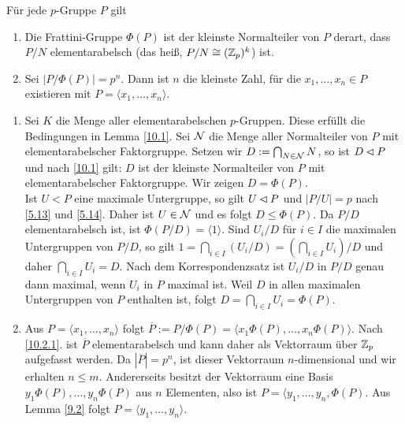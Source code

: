 \begin{satz}
\label{10.2}
F\"ur jede $p$-Gruppe $P$ gilt
\begin{enumerate}
 \item \label{10.2.1}Die Frattini-Gruppe $\Phi(P)$ ist der kleinste Normalteiler von $P$ derart, dass $P/N$ elementarabelsch (das hei\ss{}, $P/N\cong (\mathbb{Z}_p)^k$) ist.
 \item \label{10.2.2}Sei $|P/\Phi(P)|=p^n$. Dann ist $n$ die kleinste Zahl, f\"ur die $x_1,\ldots,x_n\in P$ existieren mit $P=\langle x_1,\ldots,x_n\rangle$.
\end{enumerate}


\end{satz}
\begin{beweis}\spspace
\begin{enumerate}
 \item Sei $K$ die Menge aller elementarabelschen $p$-Gruppen. Diese erf\"ullt die Bedingungen in Lemma \ref{10.1}. Sei $\mathcal{N}$ die Menge aller Normalteiler von $P$ mit elementarabelscher Faktorgruppe. Setzen wir $D:=\bigcap_{N\in \mathcal{N}} N$, so ist $D\lhd P$ und nach \ref{10.1} gilt: $D$ ist der kleinste Normalteiler von $P$ mit elementarabelscher Faktorgruppe. Wir zeigen $D=\Phi(P)$.\\
Ist $U<P$ eine maximale Untergruppe, so gilt $U\lhd P$ und $|P/U|=p$ nach \ref{5.13} und \ref{5.14}.
Daher ist $U\in \mathcal{N}$ und es folgt $D\leq \Phi(P)$.
Da $P/D$ elementarabelsch ist, ist $\Phi(P/D)=\langle 1 \rangle$. Sind $U_i/D$ f\"ur $i\in I$ die maximalen Untergruppen von $P/D$, so gilt $1=\bigcap_{i\in I}(U_i/D)=(\bigcap_{i\in I}U_i)/D$ und daher $\bigcap_{i\in I}U_i=D$. Nach dem Korrespondenzsatz ist $U_i/D$ in $P/D$ genau dann maximal, wenn $U_i$ in $P$ maximal ist. Weil $D$ in allen maximalen Untergruppen von $P$ enthalten ist, folgt $D=\bigcap_{i\in I}U_i=\Phi(P)$.
\item Aus $P=\langle x_1,\ldots,x_n\rangle$ folgt $\overline{P}:=P/\Phi(P)=\langle x_1\Phi(P),\ldots,x_n\Phi(P)\rangle$. Nach \ref{10.2.1}. ist $\overline{P}$ elementarabelsch und kann daher als Vektorraum \"uber $\mathbb{Z}_p$ aufgefasst werden. Da $|\overline{P}|=p^n$, ist dieser Vektorraum $n$-dimensional und wir erhalten $n\leq m$. Andererseits besitzt der Vektorraum eine Basis $y_1\Phi(P),\ldots,y_n\Phi(P)$ aus $n$ Elementen, also ist $P=\langle y_1,\ldots,y_n,\Phi(P)$. Aus Lemma \ref{9.2} folgt $P=\langle y_1,\ldots,y_n\rangle$.
\end{enumerate}
\end{beweis}

